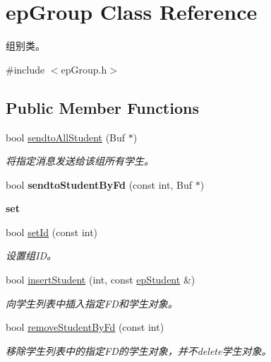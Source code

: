 \hypertarget{classepGroup}{\section{ep\-Group \-Class \-Reference}
\label{classepGroup}
}


组别类。  




{\ttfamily \#include $<$ep\-Group.\-h$>$}

\subsection*{\-Public \-Member \-Functions}
\begin{DoxyCompactItemize}
\item 
bool \hyperlink{classepGroup_aa23e3b07a638235c31a2e06547f9d320}{sendto\-All\-Student} (\-Buf $\ast$)
\begin{DoxyCompactList}\small\item\em 将指定消息发送给该组所有学生。 \end{DoxyCompactList}\item 
\hypertarget{classepGroup_a8954ffc41ea4c90151f5a1c0745d579c}{bool {\bfseries sendto\-Student\-By\-Fd} (const int, \-Buf $\ast$)}\label{classepGroup_a8954ffc41ea4c90151f5a1c0745d579c}

\end{DoxyCompactItemize}
\begin{Indent}{\bf set}\par
\begin{DoxyCompactItemize}
\item 
bool \hyperlink{classepGroup_ab892281e53a817618bfadfce6c74cbba}{set\-Id} (const int)
\begin{DoxyCompactList}\small\item\em 设置组\-I\-D。 \end{DoxyCompactList}\item 
bool \hyperlink{classepGroup_a39e9b207f6dc5a01084cd9c2d4bdf85c}{insert\-Student} (int, const \hyperlink{classepStudent}{ep\-Student} \&)
\begin{DoxyCompactList}\small\item\em 向学生列表中插入指定\-F\-D和学生对象。 \end{DoxyCompactList}\item 
bool \hyperlink{classepGroup_a346104820ed3f14e2de50925066f39c1}{remove\-Student\-By\-Fd} (const int)
\begin{DoxyCompactList}\small\item\em 移除学生列表中的指定\-F\-D的学生对象，并不delete学生对象。 \end{DoxyCompactList}\end{DoxyCompactItemize}
\end{Indent}
